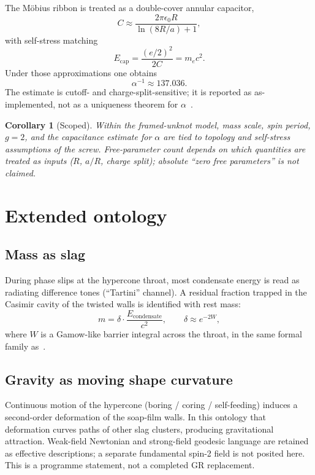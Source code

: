 \documentclass[11pt,a4paper]{article}
\newtheorem{corollary}{Corollary}[section]
\theoremstyle{definition}
\theoremstyle{remark}
\begin{document}
The M\"obius ribbon is treated as a double-cover annular capacitor,
\begin{equation}
C \approx \frac{2\pi\epsilon_0 R}{\ln(8R/a)+1},
\end{equation}
with self-stress matching
\begin{equation}
E_{\mathrm{cap}} = \frac{(e/2)^2}{2C} = m_e c^2.
\end{equation}
Under those approximations one obtains
\begin{equation}
\alpha^{-1}\approx 137.036.
\end{equation}
The estimate is cutoff- and charge-split-sensitive; it is reported as
as-implemented, not as a uniqueness theorem for $\alpha$~\cite{Mobius2026}.

\begin{corollary}[Scoped]
Within the framed-unknot model, mass scale, spin period, $g=2$, and the
capacitance estimate for $\alpha$ are tied to topology and self-stress
assumptions of the screw.  Free-parameter count depends on which
quantities are treated as inputs ($R$, $a/R$, charge split); absolute
``zero free parameters'' is not claimed.
\end{corollary}

\section{Extended ontology}
\label{sec:ontology}

\subsection{Mass as slag}

During phase slips at the hypercone throat, most condensate energy is
read as radiating difference tones (``Tartini'' channel).  A residual
fraction trapped in the Casimir cavity of the twisted walls is
identified with rest mass:
\begin{equation}
m = \delta\cdot\frac{E_{\mathrm{condensate}}}{c^2},
\qquad
\delta\approx e^{-2W},
\end{equation}
where $W$ is a Gamow-like barrier integral across the throat, in the
same formal family as~\cite{FlagDecay2026}.

\subsection{Gravity as moving shape curvature}

Continuous motion of the hypercone (boring / coring / self-feeding)
induces a second-order deformation of the soap-film walls.  In this
ontology that deformation curves paths of other slag clusters, producing
gravitational attraction.  Weak-field Newtonian and strong-field geodesic
language are retained as effective descriptions; a separate fundamental
spin-2 field is not posited here.  This is a programme statement, not a
completed GR replacement.
\end{document}
